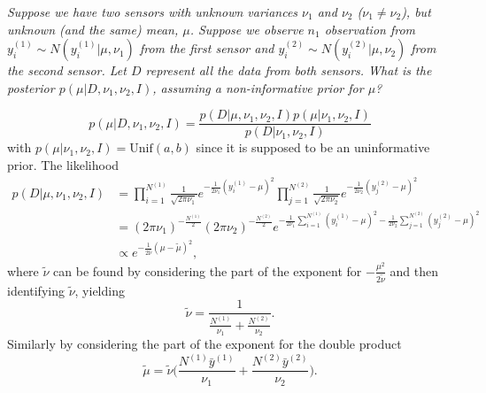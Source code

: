 \begin{example}
	\emph{Suppose we have two sensors with unknown variances $\nu_1$ and $\nu_2$ ($\nu_1\neq \nu_2$), but unknown (and the same) mean, $\mu$. Suppose we observe $n_1$ observation from $y_i^{(1)}\sim N(y_i^{(1)}|\mu,\nu_1)$ from the first sensor and $y_i^{(2)}\sim N(y_i^{(2)}|\mu,\nu_2)$ from the second sensor. Let $D$ represent all the data from both sensors. What is the posterior $p(\mu|D,\nu_1,\nu_2,I)$, assuming a non-informative prior for $\mu$?}
	
	\begin{equation}
		p(\mu|D,\nu_1,\nu_2,I) =\frac{p(D|\mu,\nu_1,\nu_2,I)p(\mu|\nu_1,\nu_2,I)}{p(D|\nu_1,\nu_2,I)}
	\end{equation}
	with $p(\mu|\nu_1,\nu_2,I)=\text{Unif}(a,b)$ since it is supposed to be an uninformative prior. The likelihood 
	\begin{equation}
		\begin{split}
			p(D|\mu,\nu_1,\nu_2,I) &= \prod_{i=1}^{N^{(1)}}\frac{1}{\sqrt{2\pi \nu_1}}e^{-\frac{1}{2\nu_1}(y_i^{(1)}-\mu)^2}\prod_{j=1}^{N^{(2)}}\frac{1}{\sqrt{2\pi \nu_2}}e^{-\frac{1}{2\nu_2}(y_j^{(2)}-\mu)^2}\\
			& = (2\pi \nu_1)^{-\frac{N^{(1)}}{2}}(2\pi \nu_2)^{-\frac{N^{(2)}}{2}}e^{-\frac{1}{2\nu_1}\sum_{i=1}^{N^{(1)}}(y_i^{(1)}-\mu)^2-\frac{1}{2\nu_2}\sum_{j=1}^{N^{(2)}}(y_j^{(2)}-\mu)^2}\\
			&\propto e^{-\frac{1}{2\tilde{\nu}}(\mu-\tilde{\mu})^2},
		\end{split}
	\end{equation}
	where $\tilde{\nu}$ can be found by considering the part of the exponent for $-\frac{\mu^2}{2\tilde{\nu}}$ and then identifying $\tilde{\nu}$, yielding
	\begin{equation}
		\tilde{\nu}= \frac{1}{\frac{N^{(1)}}{\nu_1}+\frac{N^{(2)}}{\nu_2}}.
	\end{equation}
	Similarly by considering the part of the exponent for the double product
	\begin{equation}
		\tilde{\mu} = \tilde{\nu}\bigg(\frac{N^{(1)}\bar{y}^{(1)}}{\nu_1}+\frac{N^{(2)}\bar{y}^{(2)}}{\nu_2}\bigg).
	\end{equation}
\end{example}

